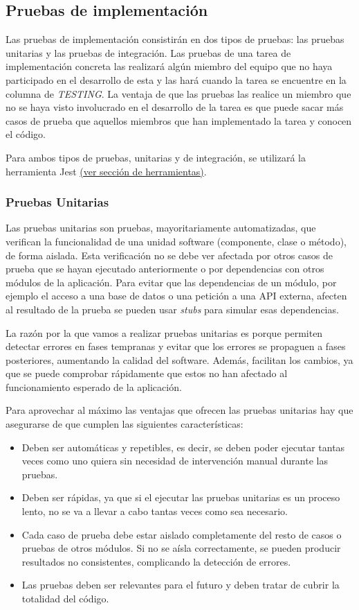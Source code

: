 \subsection{Pruebas de implementación}
Las pruebas de implementación consistirán en dos tipos de pruebas: las pruebas unitarias y las pruebas de integración. Las pruebas de una tarea de implementación concreta las realizará algún miembro del equipo que no haya participado en el desarrollo de esta y las hará cuando la tarea se encuentre en la columna de \textit{TESTING}. La ventaja de que las pruebas las realice un miembro que no se haya visto involucrado en el desarrollo de la tarea es que puede sacar más casos de prueba que aquellos miembros que han implementado la tarea y conocen el código.

Para ambos tipos de pruebas, unitarias y de integración, se utilizará la herramienta Jest \underline{(ver sección de herramientas)}.
\subsubsection{Pruebas Unitarias}
Las pruebas unitarias son pruebas, mayoritariamente automatizadas, que verifican la funcionalidad de una unidad software (componente, clase o método), de forma aislada. Esta verificación no se debe ver afectada por otros casos de prueba que se hayan ejecutado anteriormente o por dependencias con otros módulos de la aplicación. Para evitar que las dependencias de un módulo, por ejemplo el acceso a una base de datos o una petición a una API externa, afecten al resultado de la prueba se pueden usar \textit{stubs} para simular esas dependencias.

La razón por la que vamos a realizar pruebas unitarias es porque permiten detectar errores en fases tempranas y evitar que los errores se propaguen a fases posteriores, aumentando la calidad del software. Además, facilitan los cambios, ya que se puede comprobar rápidamente que estos no han afectado al funcionamiento esperado de la aplicación.

Para aprovechar al máximo las ventajas que ofrecen las pruebas unitarias hay que asegurarse de que cumplen las siguientes características:
\begin{itemize}
    \item Deben ser automáticas y repetibles, es decir, se deben poder ejecutar tantas veces como uno quiera sin necesidad de intervención manual durante las pruebas.
    \item Deben ser rápidas, ya que si el ejecutar las pruebas unitarias es un proceso lento, no se va a llevar a cabo tantas veces como sea necesario.
    \item Cada caso de prueba debe estar aislado completamente del resto de casos o pruebas de otros módulos. Si no se aísla correctamente, se pueden producir resultados no consistentes, complicando la detección de errores.
    \item Las pruebas deben ser relevantes para el futuro y deben tratar de cubrir la totalidad del código.
\end{itemize}
